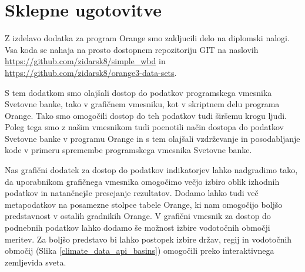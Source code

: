 \chapter{Sklepne ugotovitve}



Z izdelavo dodatka za program Orange smo zakljucili delo na diplomski nalogi.
Vsa koda se nahaja na prosto dostopnem repozitoriju GIT na naslovih
\url{https://github.com/zidarsk8/simple_wbd} in
\url{https://github.com/zidarsk8/orange3-data-sets}.




S tem dodatkom smo olajšali dostop do podatkov programskega vmesnika Svetovne 
banke, tako v grafičnem vmesniku, kot v skriptnem delu programa Orange. Tako
smo omogočili dostop do teh podatkov tudi širšemu krogu ljudi. Poleg tega
smo z našim vmesnikom tudi poenotili način dostopa do podatkov Svetovne banke
v programu Orange in s tem olajšali vzdrževanje in posodabljanje kode v
primeru spremembe programskega vmesnika Svetovne banke.



Nas grafični dodatek za dostop do podatkov indikatorjev lahko nadgradimo tako,
da uporabnikom grafičnega vmesnika omogočimo večjo izbiro oblik izhodnih
podatkov in natančnejše presejanje rezultatov. Dodamo lahko tudi več
metapodatkov na posamezne stolpce tabele Orange, ki nam omogočijo boljšo
predstavnost v ostalih gradnikih Orange. V grafični vmesnik za dostop do
podnebnih podatkov lahko dodamo še možnost izbire vodotočnih območji meritev.
Za boljšo predstavo bi lahko postopek izbire držav, regij in vodotočnih
območij (Slika \ref{climate_data_api_basins}) omogočili preko interaktivnega 
zemljevida sveta.

% 
% 
